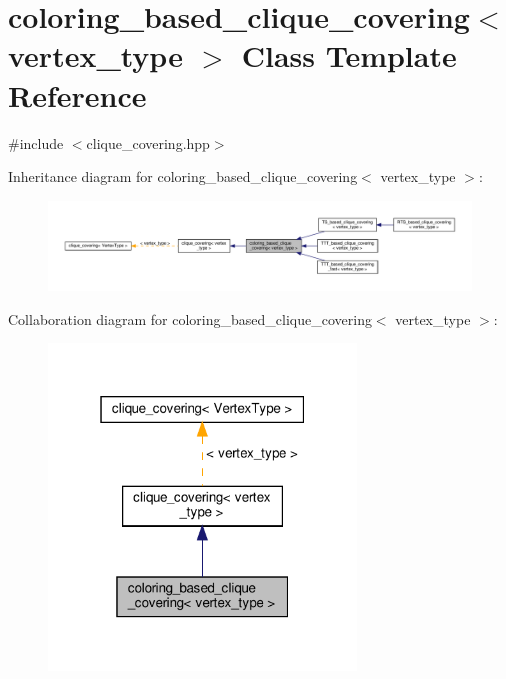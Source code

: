 \hypertarget{classcoloring__based__clique__covering}{}\section{coloring\+\_\+based\+\_\+clique\+\_\+covering$<$ vertex\+\_\+type $>$ Class Template Reference}
\label{classcoloring__based__clique__covering}


{\ttfamily \#include $<$clique\+\_\+covering.\+hpp$>$}



Inheritance diagram for coloring\+\_\+based\+\_\+clique\+\_\+covering$<$ vertex\+\_\+type $>$\+:
\nopagebreak
\begin{figure}[H]
\begin{center}
\leavevmode
\includegraphics[width=350pt]{d7/db7/classcoloring__based__clique__covering__inherit__graph}
\end{center}
\end{figure}


Collaboration diagram for coloring\+\_\+based\+\_\+clique\+\_\+covering$<$ vertex\+\_\+type $>$\+:
\nopagebreak
\begin{figure}[H]
\begin{center}
\leavevmode
\includegraphics[width=232pt]{d6/d31/classcoloring__based__clique__covering__coll__graph}
\end{center}
\end{figure}
